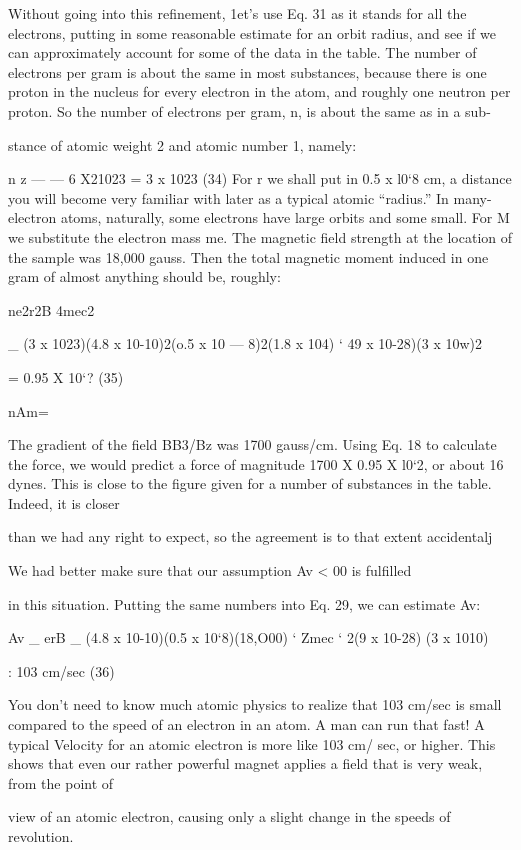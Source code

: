 {{{Without going into this refinement, 1et's use Eq. 31 as it stands
for all the electrons, putting in some reasonable estimate for an orbit
radius, and see if we can approximately account for some of the data
in the table. The number of electrons per gram is about the same
in most substances, because there is one proton in the nucleus for
every electron in the atom, and roughly one neutron per proton. So
the number of electrons per gram, n, is about the same as in a sub-

stance of atomic weight 2 and atomic number 1, namely:

n z  ---  --- 6 X21023 = 3 x 1023 (34)
For r we shall put in 0.5 x l0‘8 cm, a distance you will become very
familiar with later as a typical atomic ``radius.'' In many-electron
atoms, naturally, some electrons have large orbits and some small.
For M we substitute the electron mass me. The magnetic field
strength at the location of the sample was 18,000 gauss. Then the
total magnetic moment induced in one gram of almost anything
should be, roughly:

ne2r2B
4mec2

_ (3 x 1023)(4.8 x 10-10)2(o.5 x 10 --- 8)2(1.8 x 104)
‘ 49 x 10-28)(3 x 10w)2

= 0.95 X 10‘? (35)

nAm=

The gradient of the field BB3/Bz was 1700 gauss/cm. Using Eq. 18
to calculate the force, we would predict a force of magnitude
1700 X 0.95 X l0‘2, or about 16 dynes. This is close to the figure
given for a number of substances in the table. Indeed, it is closer

than we had any right to expect, so the agreement is to that extent
accidentalj

We had better make sure that our assumption Av < 00 is fulfilled

in this situation. Putting the same numbers into Eq. 29, we can
estimate Av:

Av _ erB _ (4.8 x 10-10)(0.5 x 10‘8)(18,O00)
‘ Zmec ‘ 2(9 x 10-28) (3 x 1010)

: 103 cm/sec (36)

You don't need to know much atomic physics to realize that
103 cm/sec is small compared to the speed of an electron in an atom.
A man can run that fast! A typical Velocity for an atomic electron
is more like 103 cm/ sec, or higher. This shows that even our rather
powerful magnet applies a field that is very weak, from the point of

view of an atomic electron, causing only a slight change in the speeds
of revolution.

}}}
